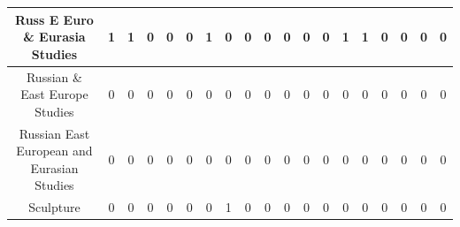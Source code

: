 \documentclass[10pt]{article}
\begin{document}
\begin{landscape}
\begin{longtable}[c]{|ccccccccccccccccccc|}
	\multicolumn{1}{|c|}{Russ E Euro \& Eurasia Studies}             & \multicolumn{1}{c|}{1}          & \multicolumn{1}{c|}{1}          & \multicolumn{1}{c|}{0}          & \multicolumn{1}{c|}{0}          & \multicolumn{1}{c|}{0}          & \multicolumn{1}{c|}{1}          & \multicolumn{1}{c|}{0}          & \multicolumn{1}{c|}{0}          & \multicolumn{1}{c|}{0}          & \multicolumn{1}{c|}{0}          & \multicolumn{1}{c|}{0}          & \multicolumn{1}{c|}{0}          & \multicolumn{1}{c|}{1}          & \multicolumn{1}{c|}{1}          & \multicolumn{1}{c|}{0}          & \multicolumn{1}{c|}{0}          & \multicolumn{1}{c|}{0}          & 0          \\ \hline
	\multicolumn{1}{|c|}{Russian \& East Europe Studies}             & \multicolumn{1}{c|}{0}          & \multicolumn{1}{c|}{0}          & \multicolumn{1}{c|}{0}          & \multicolumn{1}{c|}{0}          & \multicolumn{1}{c|}{0}          & \multicolumn{1}{c|}{0}          & \multicolumn{1}{c|}{0}          & \multicolumn{1}{c|}{0}          & \multicolumn{1}{c|}{0}          & \multicolumn{1}{c|}{0}          & \multicolumn{1}{c|}{0}          & \multicolumn{1}{c|}{0}          & \multicolumn{1}{c|}{0}          & \multicolumn{1}{c|}{0}          & \multicolumn{1}{c|}{0}          & \multicolumn{1}{c|}{0}          & \multicolumn{1}{c|}{0}          & 0          \\ \hline
	\multicolumn{1}{|c|}{Russian East European and Eurasian Studies} & \multicolumn{1}{c|}{0}          & \multicolumn{1}{c|}{0}          & \multicolumn{1}{c|}{0}          & \multicolumn{1}{c|}{0}          & \multicolumn{1}{c|}{0}          & \multicolumn{1}{c|}{0}          & \multicolumn{1}{c|}{0}          & \multicolumn{1}{c|}{0}          & \multicolumn{1}{c|}{0}          & \multicolumn{1}{c|}{0}          & \multicolumn{1}{c|}{0}          & \multicolumn{1}{c|}{0}          & \multicolumn{1}{c|}{0}          & \multicolumn{1}{c|}{0}          & \multicolumn{1}{c|}{0}          & \multicolumn{1}{c|}{0}          & \multicolumn{1}{c|}{0}          & 0          \\ \hline
	\multicolumn{1}{|c|}{Sculpture}                                  & \multicolumn{1}{c|}{0}          & \multicolumn{1}{c|}{0}          & \multicolumn{1}{c|}{0}          & \multicolumn{1}{c|}{0}          & \multicolumn{1}{c|}{0}          & \multicolumn{1}{c|}{0}          & \multicolumn{1}{c|}{1}          & \multicolumn{1}{c|}{0}          & \multicolumn{1}{c|}{0}          & \multicolumn{1}{c|}{0}          & \multicolumn{1}{c|}{0}          & \multicolumn{1}{c|}{0}          & \multicolumn{1}{c|}{0}          & \multicolumn{1}{c|}{0}          & \multicolumn{1}{c|}{0}          & \multicolumn{1}{c|}{0}          & \multicolumn{1}{c|}{0}          & 0          \\ \hline

\end{longtable}
\end{landscape}
\end{document}
